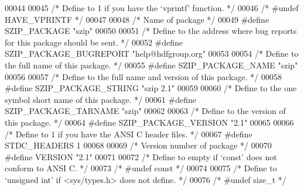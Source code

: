 \begin{DoxyCode}
00044 
00045 \textcolor{comment}{/* Define to 1 if you have the `vprintf' function. */}
00046 \textcolor{comment}{/* #undef HAVE\_VPRINTF */}
00047 
00048 \textcolor{comment}{/* Name of package */}
00049 \textcolor{preprocessor}{#define SZIP\_PACKAGE "szip"}
00050 
00051 \textcolor{comment}{/* Define to the address where bug reports for this package should be sent. */}
00052 \textcolor{preprocessor}{#define SZIP\_PACKAGE\_BUGREPORT "help@hdfgroup.org"}
00053 
00054 \textcolor{comment}{/* Define to the full name of this package. */}
00055 \textcolor{preprocessor}{#define SZIP\_PACKAGE\_NAME "szip"}
00056 
00057 \textcolor{comment}{/* Define to the full name and version of this package. */}
00058 \textcolor{preprocessor}{#define SZIP\_PACKAGE\_STRING "szip 2.1"}
00059 
00060 \textcolor{comment}{/* Define to the one symbol short name of this package. */}
00061 \textcolor{preprocessor}{#define SZIP\_PACKAGE\_TARNAME "szip"}
00062 
00063 \textcolor{comment}{/* Define to the version of this package. */}
00064 \textcolor{preprocessor}{#define SZIP\_PACKAGE\_VERSION "2.1"}
00065 
00066 \textcolor{comment}{/* Define to 1 if you have the ANSI C header files. */}
00067 \textcolor{preprocessor}{#define STDC\_HEADERS 1}
00068 
00069 \textcolor{comment}{/* Version number of package */}
00070 \textcolor{preprocessor}{#define VERSION "2.1"}
00071 
00072 \textcolor{comment}{/* Define to empty if `const' does not conform to ANSI C. */}
00073 \textcolor{comment}{/* #undef const */}
00074 
00075 \textcolor{comment}{/* Define to `unsigned int' if <sys/types.h> does not define. */}
00076 \textcolor{comment}{/* #undef size\_t */}
\end{DoxyCode}
